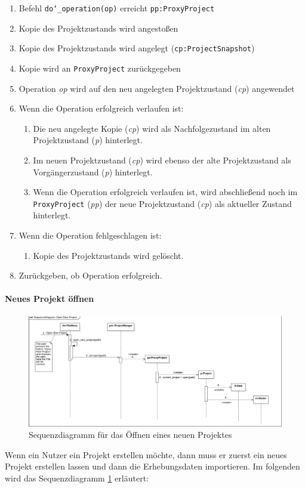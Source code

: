\documentclass{article}
\begin{document}
\begin{enumerate}
    \item[1.] Befehl \texttt{do\char`_operation(op)} erreicht \texttt{pp:ProxyProject}
    \item[2.] Kopie des Projektzustands wird angestoßen
    \item[3.] Kopie des Projektzustands wird angelegt (\texttt{cp:ProjectSnapshot})
    \item[4.] Kopie wird an \texttt{ProxyProject} zurückgegeben
    \item[4.5.] Operation \emph{op} wird auf den neu angelegten Projektzustand (\emph{cp}) angewendet
    \item[] Wenn die Operation erfolgreich verlaufen ist:
    \begin{enumerate}
        \item[5.] Die neu angelegte Kopie (\emph{cp}) wird als Nachfolgezustand im alten Projektzustand (\emph{p}) hinterlegt.
        \item[7.] Im neuen Projektzustand (\emph{cp}) wird ebenso der alte Projektzustand als Vorgängerzustand (\emph{p}) hinterlegt.
        \item[9.] Wenn die Operation erfolgreich verlaufen ist, wird abschließend noch im \texttt{ProxyProject} (\emph{pp}) der neue Projektzustand (\emph{cp}) als aktueller Zustand hinterlegt.
    \end{enumerate}
    \item[] Wenn die Operation fehlgeschlagen ist:
    \begin{enumerate}
        \item[11.] Kopie des Projektzustands wird gelöscht.
    \end{enumerate}
    \item[12.] Zurückgeben, ob Operation erfolgreich.
    
\end{enumerate}

\paragraph{Neues Projekt öffnen}\mbox{}
\begin{figure}[H]%
    \includegraphics[width=15cm]{entwurf/Entwurf_dokument/img/Alissa/SQOpenNewProject3.png}
    \caption{Sequenzdiagramm für das Öffnen eines neuen Projektes}
    \label{fig:sd:openNewProject}
\end{figure}
Wenn ein Nutzer ein Projekt erstellen möchte, dann muss er zuerst ein neues Projekt erstellen lassen und dann die Erhebungsdaten importieren. Im folgenden wird das Sequenzdiagramm \ref{fig:sd:openNewProject} erläutert:
\end{document}
